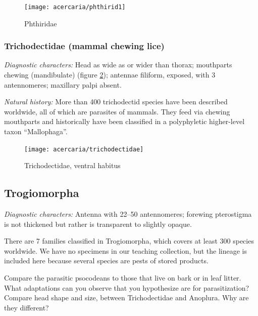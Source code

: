 \begin{figure}[ht!]
 \centering
 \texttt{[image: acercaria/phthirid1]}
 \caption{Phthiridae \citep[redrawn from][Fig. 176]{chandler1922animal}}
 \label{fig:phthirid}
\end{figure}

\subsubsection{Trichodectidae (mammal chewing lice)}
\noindent{}\textit{Diagnostic characters:} Head as wide as or wider than thorax; mouthparts chewing (mandibulate) (figure \ref{fig:trichodectid}); antennae filiform, exposed, with 3 antennomeres; maxillary palpi absent.\vspace{3mm}

\noindent{}\textit{Natural history:} More than 400 trichodectid species have been described worldwide, all of which are parasites of mammals. They feed via chewing mouthparts and historically have been classified in a polyphyletic higher-level taxon ``Mallophaga''.\vspace{3mm}

\begin{figure}[ht!]
 \centering
 \texttt{[image: acercaria/trichodectidae]}
 \caption{Trichodectidae, ventral habitus \citep[redrawn from][Fig. 9B]{snodgrass1944feeding}}
 \label{fig:trichodectid}
\end{figure}

\subsection{Trogiomorpha}
\noindent{}\textit{Diagnostic characters:} Antenna with 22--50 antennomeres; forewing pterostigma is not thickened but rather is transparent to slightly opaque.\vspace{3mm}

\noindent{}There are 7 families classified in Trogiomorpha, which covers at least 300 species worldwide. We have no specimens in our teaching collection, but the lineage is included here because several species are pests of stored products.\vspace{3mm}

\begin{theo}
{}Compare the parasitic psocodeans to those that live on bark or in leaf litter. What adaptations can you observe that you hypothesize are for parasitization? Compare head shape and size, between Trichodectidae and Anoplura. Why are they different?
\end{theo}

